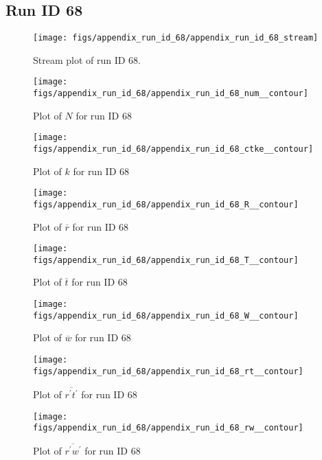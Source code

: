 \subsection{Run ID 68}
\begin{figure}[H]
\centering
\texttt{[image: figs/appendix\_run\_id\_68/appendix\_run\_id\_68\_stream]}
\caption{Stream plot of run ID 68.}
\label{fig:appendix_run_id_68_stream}
\end{figure}


\begin{figure}[H]
\centering
\texttt{[image: figs/appendix\_run\_id\_68/appendix\_run\_id\_68\_num\_\_contour]}
\caption{Plot of $N$ for run ID 68}
\label{fig:appendix_run_id_68_num__contour}
\end{figure}


\begin{figure}[H]
\centering
\texttt{[image: figs/appendix\_run\_id\_68/appendix\_run\_id\_68\_ctke\_\_contour]}
\caption{Plot of $k$ for run ID 68}
\label{fig:appendix_run_id_68_ctke__contour}
\end{figure}


\begin{figure}[H]
\centering
\texttt{[image: figs/appendix\_run\_id\_68/appendix\_run\_id\_68\_R\_\_contour]}
\caption{Plot of $\overline{r}$ for run ID 68}
\label{fig:appendix_run_id_68_R__contour}
\end{figure}


\begin{figure}[H]
\centering
\texttt{[image: figs/appendix\_run\_id\_68/appendix\_run\_id\_68\_T\_\_contour]}
\caption{Plot of $\overline{t}$ for run ID 68}
\label{fig:appendix_run_id_68_T__contour}
\end{figure}


\begin{figure}[H]
\centering
\texttt{[image: figs/appendix\_run\_id\_68/appendix\_run\_id\_68\_W\_\_contour]}
\caption{Plot of $\overline{w}$ for run ID 68}
\label{fig:appendix_run_id_68_W__contour}
\end{figure}


\begin{figure}[H]
\centering
\texttt{[image: figs/appendix\_run\_id\_68/appendix\_run\_id\_68\_rt\_\_contour]}
\caption{Plot of $\overline{r^\prime t^\prime}$ for run ID 68}
\label{fig:appendix_run_id_68_rt__contour}
\end{figure}


\begin{figure}[H]
\centering
\texttt{[image: figs/appendix\_run\_id\_68/appendix\_run\_id\_68\_rw\_\_contour]}
\caption{Plot of $\overline{r^\prime w^\prime}$ for run ID 68}
\label{fig:appendix_run_id_68_rw__contour}
\end{figure}


